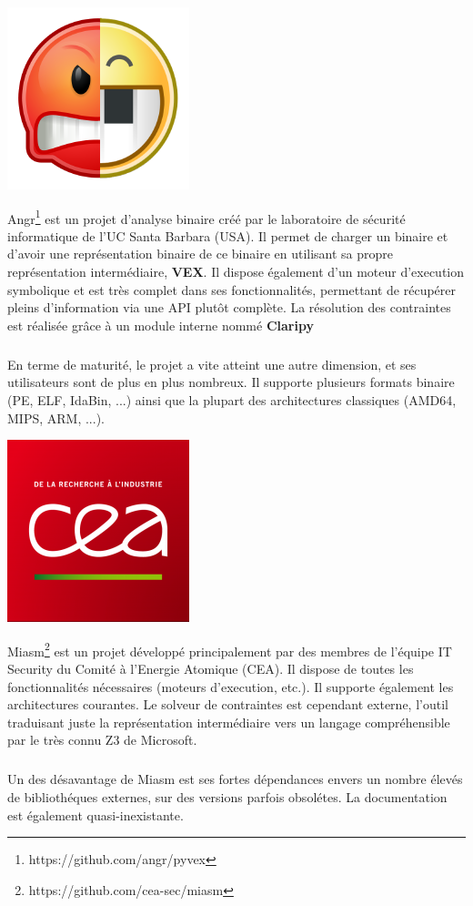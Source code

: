 \begin{center}
\includegraphics[scale=0.3]{angr.png}
\end{center}
Angr\footnote{https://github.com/angr/pyvex} est un projet d'analyse binaire créé par le laboratoire de sécurité informatique de l'UC Santa Barbara (USA).
Il permet de charger un binaire et d'avoir une représentation binaire de ce binaire en utilisant sa propre représentation intermédiaire, \textbf{VEX}.
Il dispose également d'un moteur d'execution symbolique et est très complet dans ses fonctionnalités, permettant de récupérer pleins d'information via
une API plutôt complète. La résolution des contraintes est réalisée grâce à un module interne nommé \textbf{Claripy}
\subparagraph{}
En terme de maturité, le projet a vite atteint une autre dimension, et ses utilisateurs sont de plus en plus nombreux. Il supporte plusieurs formats
binaire (PE, ELF, IdaBin, ...) ainsi que la plupart des architectures classiques (AMD64, MIPS, ARM, ...).

\begin{center}
\includegraphics[scale=0.3]{cea.png}
\end{center}
Miasm\footnote{https://github.com/cea-sec/miasm} est un projet développé principalement par des membres de l'équipe IT Security du Comité à l'Energie Atomique (CEA).
Il dispose de toutes les fonctionnalités nécessaires (moteurs d'execution, etc.). Il supporte également les architectures courantes. Le solveur de contraintes est
cependant externe, l'outil traduisant juste la représentation intermédiaire vers un langage compréhensible par le très connu Z3 de Microsoft.
\subparagraph{}
Un des désavantage de Miasm est ses fortes dépendances envers un nombre élevés de bibliothéques externes, sur des versions parfois obsolétes. La documentation est également
quasi-inexistante.

